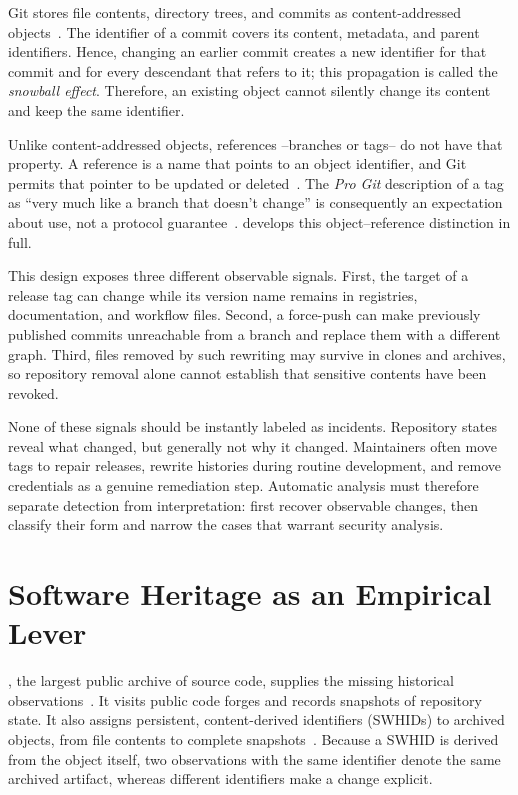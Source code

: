 \label{subsec:intro-mutability-challenge}%
Git stores file contents, directory trees, and commits as content-addressed objects~\cite{ProGit2014}.
The identifier of a commit covers its content, metadata, and parent identifiers.
Hence, changing an earlier commit creates a new identifier for that commit and for every descendant that refers to it; this propagation is called the \emph{snowball effect}.
Therefore, an existing object cannot silently change its content and keep the same identifier.

Unlike content-addressed objects, references --branches or tags-- do not have that property.
A reference is a name that points to an object identifier, and Git permits that pointer to be updated or deleted~\cite{ProGit2014,git_tag_retagging_docs}.
The \emph{Pro Git} description of a tag as ``very much like a branch that doesn't change'' is consequently an expectation about use, not a protocol guarantee~\cite{ProGit2014}.
 develops this object--reference distinction in full.

\label{subsec:intro-benign-vs-security}%
This design exposes three different observable signals.
First, the target of a release tag can change while its version name remains in registries, documentation, and workflow files.
Second, a force-push can make previously published commits unreachable from a branch and replace them with a different graph.
Third, files removed by such rewriting may survive in clones and archives, so repository removal alone cannot establish that sensitive contents have been revoked.

\label{subsec:intro-reproducibility-auditing}%
None of these signals should be instantly labeled as incidents.
Repository states reveal what changed, but generally not why it changed.
Maintainers often move tags to repair releases, rewrite histories during routine development, and remove credentials as a genuine remediation step.
Automatic analysis must therefore separate detection from interpretation: first recover observable changes, then classify their form and narrow the cases that warrant security analysis.

\section{Software Heritage as an Empirical Lever}
\label{sec:intro-objectives}

\label{subsec:intro-obj-tags}%
\SWH, the largest public archive of source code, supplies the missing historical observations~\cite{swhcacm2018}.
It visits public code forges and records snapshots of repository state.
It also assigns persistent, content-derived identifiers (SWHIDs) to archived objects, from file contents to complete snapshots~\cite{iso-swhid}.
Because a SWHID is derived from the object itself, two observations with the same identifier denote the same archived artifact, whereas different identifiers make a change explicit.

